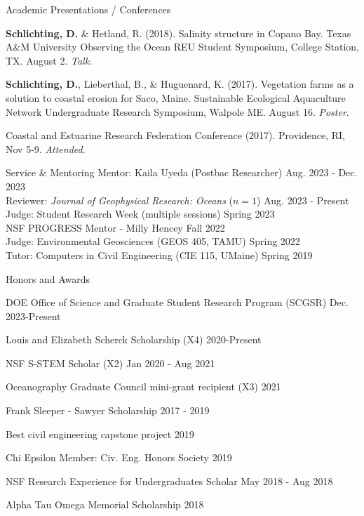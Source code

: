 \documentclass{resume} %
\begin{document}
\begin{rSection}{Academic Presentations / Conferences}
\begin{etaremune}
    \item \textbf{Schlichting, D.} \& Hetland, R. (2018). Salinity structure in Copano Bay. Texas A$\&$M University Observing the Ocean REU Student Symposium, College Station, TX. August 2. \textit{Talk}.
    \item \textbf{Schlichting, D.}, Lieberthal, B., \& Huguenard, K. (2017). Vegetation farms as a solution to coastal erosion for Saco, Maine. Sustainable Ecological Aquaculture Network Undergraduate Research Symposium, Walpole ME. August 16. \textit{Poster}.
    \item Coastal and Estuarine Research Federation Conference (2017). Providence, RI, Nov 5-9. \textit{Attended}.
\end{etaremune}
\end{rSection}

\begin{rSection}{Service \& Mentoring}
Mentor: Kaila Uyeda (Postbac Researcher) \hfill Aug. 2023 - Dec. 2023 \\
Reviewer: \textit{Journal of Geophysical Research: Oceans} ($n=1$) \hfill Aug. 2023 - Present \\
Judge: Student Research Week (multiple sessions) \hfill Spring 2023 \\
NSF PROGRESS Mentor - Milly Hencey \hfill Fall 2022 \\
Judge: Environmental Geosciences (GEOS 405, TAMU) \hfill Spring 2022 \\
Tutor: Computers in Civil Engineering (CIE 115, UMaine) \hfill Spring 2019 \\
\end{rSection}
\vspace{-10pt}
\begin{rSection}{Honors and Awards} \itemsep -3pt {}
\vspace{-7pt}
\item DOE Office of Science and Graduate Student Research Program (SCGSR) \hfill Dec. 2023-Present
\item Louis and Elizabeth Scherck Scholarship (X4) \hfill 2020-Present
\item NSF S-STEM Scholar (X2) \hfill Jan 2020 - Aug 2021 
\item Oceanography Graduate Council mini-grant recipient (X3) \hfill 2021
\item Frank Sleeper - Sawyer Scholarship \hfill 2017 - 2019
\item Best civil engineering capstone project \hfill 2019
\item Chi Epsilon Member: Civ. Eng. Honors Society \hfill 2019 
\item NSF Research Experience for Undergraduates Scholar \hfill May 2018 - Aug 2018
\item Alpha Tau Omega Memorial Scholarship \hfill 2018
\end{rSection}
\end{document}

